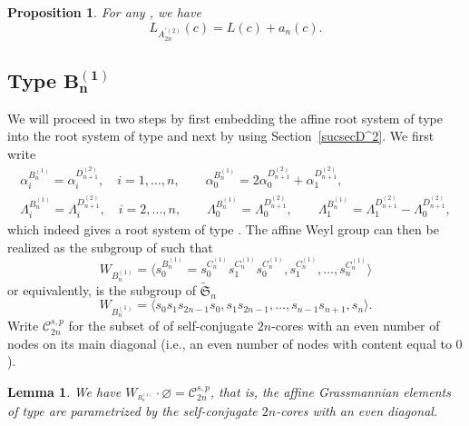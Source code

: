 \documentclass[10pt,a4paper]{amsart}
\newtheorem{Lemma}[Theorem]{Lemma}
\newtheorem{Proposition}[Theorem]{Proposition}
 { \theoremstyle{definition}
\newtheorem{Definition}[Theorem]{Definition}
\newtheorem{Note}[Theorem]{Note}
\newtheorem{Example}[Theorem]{Example}
\newtheorem{Remark}[Theorem]{Remark} }
\numberwithin{equation}{section}
\begin{document}
\begin{Proposition}
	\label{Prop_A(2n,2)prime} For any , we have
	\begin{equation*}
	L_{A_{2n}^{\prime (2)}}(c)=L(c)+a_{n}(c).
	\end{equation*}
\end{Proposition}

\subsection[Type B\_n\^{}(1)]{Type $\boldsymbol{B_{n}^{(1)}}$}

We will proceed in two steps by first embedding the affine root system of
type  into the root system of type  and next by
using Section~\ref{sucsecD^2}. We first write%
\begin{gather}
\alpha _{i}^{B_{n}^{(1)}}=\alpha _{i}^{D_{n+1}^{(2)}},\quad i=1,\dots ,n, \qquad
\alpha _{0}^{B_{n}^{(1)}}=2\alpha _{0}^{D_{n+1}^{(2)}}+\alpha
_{1}^{D_{n+1}^{(2)}},\nonumber\\
\Lambda _{i}^{B_{n}^{(1)}}=\Lambda _{i}^{D_{n+1}^{(2)}},\quad i=2,\dots ,n, \qquad
\Lambda _{0}^{B_{n}^{(1)}}=\Lambda _{0}^{D_{n+1}^{(2)}}, \qquad
\Lambda _{1}^{B_{n}^{(1)}}=\Lambda _{1}^{D_{n+1}^{(2)}}-\Lambda
_{0}^{D_{n+1}^{(2)}},
  \label{RelBA}
\end{gather}%
which indeed gives a root system of type . The affine Weyl
group  can then be realized as the subgroup of  such that
\begin{equation*}
W_{B_{n}^{(1)}}=\bigl\langle
s_{0}^{B_{n}^{(1)}}=s_{0}^{C_{n}^{(1)}}s_{1}^{C_{n}^{(1)}}s_{0}^{C_{n}^{(1)}},s_{1}^{C_{n}^{(1)}},\dots ,s_{n}^{C_{n}^{(1)}}\bigr\rangle
\end{equation*}%
or equivalently,  is the subgroup of $\widetilde{\mathfrak{S%
}}_{n}$%
\begin{equation*}
W_{B_{n}^{(1)}}=\langle s_{0}s_{1}s_{2n-1}s_{0},s_{1}s_{2n-1},\dots
,s_{n-1}s_{n+1},s_{n}\rangle .
\end{equation*}%
Write $\mathcal{C}_{2n}^{s,p}$ for the subset of  of
self-conjugate $2n$-cores with an even number of nodes on its main diagonal
(i.e., an even number of nodes with content equal to $0$).

\begin{Lemma}
	We have $W_{^{B_{n}^{(1)}}}\cdot \varnothing =\mathcal{C}_{2n}^{s,p}$, that is,
	the affine Grassmannian elements of type  are parametrized by
	the self-conjugate $2n$-cores with an even diagonal.
\end{Lemma}
\end{document}
